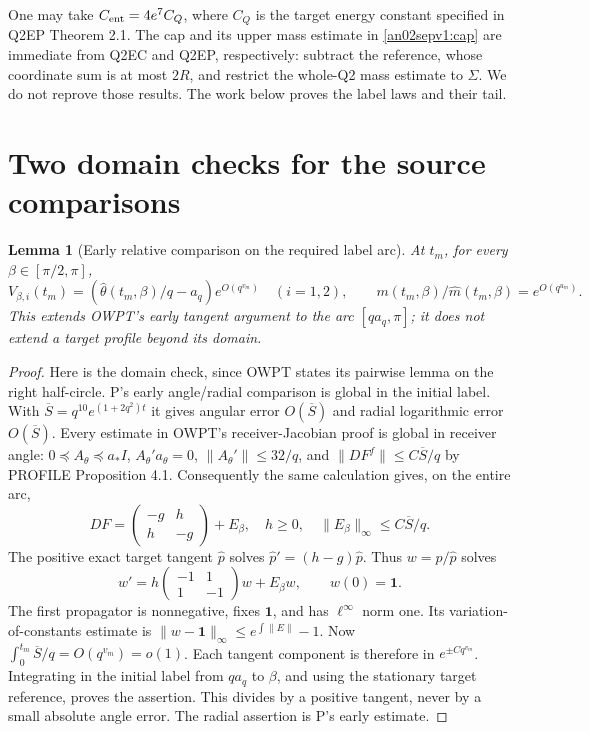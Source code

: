 \documentclass[11pt]{article}
\newtheorem{lemma}[theorem]{Lemma}
\theoremstyle{remark}\newtheorem{remark}[theorem]{Remark}
\newcommand{\one}{\mathbf1}
\begin{document}
One may take $C_{\rm ent}=4e^7C_Q$, where $C_Q$ is the
target energy constant specified in Q2EP Theorem 2.1.
The cap and its upper mass estimate in \eqref{an02sepv1:cap}
are immediate from Q2EC and Q2EP, respectively: subtract the
reference, whose coordinate sum is at most $2R$, and restrict
the whole-Q2 mass estimate to $\Sigma$. We do not reprove those
results. The work below proves the label laws and their tail.

\section{Two domain checks for the source comparisons}
\begin{lemma}[Early relative comparison on the required label arc]
\label{an02sepv1:early}
At $t_m$, for every $\beta\in[\pi/2,\pi]$,
\[
 V_{\beta,i}(t_m)=
   (\widehat\theta(t_m,\beta)/q-a_q)e^{O(q^{v_m})}\quad(i=1,2),
 \qquad m(t_m,\beta)/\widehat m(t_m,\beta)=e^{O(q^{u_m})}.
\]
This extends OWPT's early tangent argument to the arc
$[qa_q,\pi]$; it does not extend a target profile beyond its domain.
\end{lemma}
\begin{proof}
Here is the domain check, since OWPT states its pairwise lemma
on the right half-circle. P's early angle/radial comparison is
global in the initial label. With
$\overline S=q^{10}e^{(1+2q^2)t}$ it gives angular error
$O(\overline S)$ and radial logarithmic error $O(\overline S)$.
Every estimate in OWPT's receiver-Jacobian proof is global in
receiver angle: $0\preceq A_\theta\preceq a_*I$,
$A_\theta'a_\theta=0$, $\|A_\theta'\|\le32/q$, and
$\|DF^f\|\le C\overline S/q$ by PROFILE Proposition 4.1.
Consequently the same calculation gives, on the entire arc,
\[
 DF=\begin{pmatrix}-g&h\\h&-g\end{pmatrix}+E_\beta,
 \quad h\ge0,\quad \|E_\beta\|_\infty\le C\overline S/q.
\]
The positive exact target tangent $\widehat p$ solves
$\widehat p'=(h-g)\widehat p$. Thus $w=p/\widehat p$ solves
\[
 w'=h\begin{pmatrix}-1&1\\1&-1\end{pmatrix}w+E_\beta w,
 \qquad w(0)=\one.
\]
The first propagator is nonnegative, fixes $\one$, and has
$\ell^\infty$ norm one. Its variation-of-constants estimate
is $\|w-\one\|_\infty\le e^{\int\|E\|}-1$.
Now $\int_0^{t_m}\overline S/q=O(q^{v_m})=o(1)$.
Each tangent component is therefore in $e^{\pm Cq^{v_m}}$.
Integrating in the initial label from $qa_q$ to $\beta$, and
using the stationary target reference, proves the assertion.
This divides by a positive tangent, never by a small absolute
angle error. The radial assertion is P's early estimate.
\end{proof}
\end{document}
